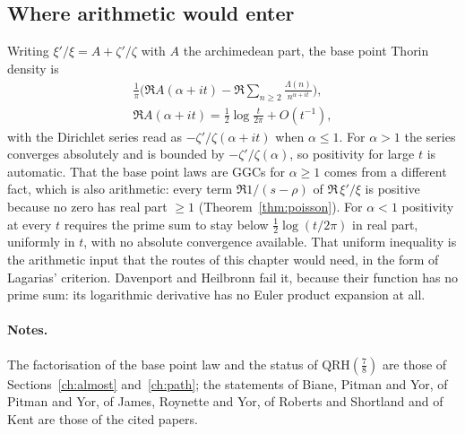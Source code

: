 \subsection{Where arithmetic would enter}
Writing $\xi'/\xi=A+\zeta'/\zeta$ with $A$ the archimedean part, the base point Thorin density is
\begin{gather*}
\frac1\pi\Big(\Re A(\alpha+it)-\Re\sum_{n\ge2}\frac{\Lambda(n)}{n^{\alpha+it}}\Big),\\
\Re A(\alpha+it)=\tfrac12\log\frac t{2\pi}+O(t^{-1}),
\end{gather*}
with the Dirichlet series read as $-\zeta'/\zeta(\alpha+it)$ when $\alpha\le1$. For $\alpha>1$ the series converges absolutely and is bounded by $-\zeta'/\zeta(\alpha)$, so positivity for large $t$ is automatic. That the base point laws are GGCs for $\alpha\ge1$ comes from a different fact, which is also arithmetic: every term $\Re1/(s-\rho)$ of $\Re\,\xi'/\xi$ is positive because no zero has real part $\ge1$ (Theorem~\ref{thm:poisson}). For $\alpha<1$ positivity at every $t$ requires the prime sum to stay below $\frac12\log(t/2\pi)$ in real part, uniformly in $t$, with no absolute convergence available. That uniform inequality is the arithmetic input that the routes of this chapter would need, in the form of Lagarias' criterion. Davenport and Heilbronn fail it, because their function has no prime sum: its logarithmic derivative has no Euler product expansion at all.

\paragraph{Notes.} The factorisation of the base point law and the status of $\mathrm{QRH}(\frac78)$ are those of Sections~\ref{ch:almost} and~\ref{ch:path}; the statements of Biane, Pitman and Yor, of Pitman and Yor, of James, Roynette and Yor, of Roberts and Shortland and of Kent are those of the cited papers.

